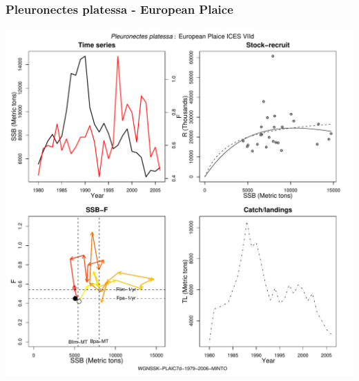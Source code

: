 \subsubsection{Pleuronectes platessa - European Plaice}
\begin{center}
\includegraphics[width=1.2\textwidth]{../R/figures/WGNSSK-PLAIC7d-1979-2006-MINTO.pdf}
\end{center}

